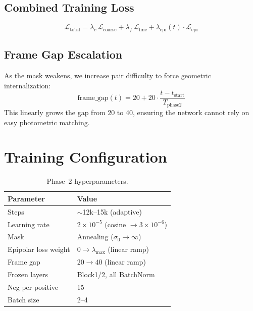 \documentclass[11pt,a4paper]{article}
\begin{document}
\subsection{Combined Training Loss}

\begin{equation}
    \mathcal{L}_{\text{total}} = \lambda_c\,\mathcal{L}_{\text{coarse}} + \lambda_f\,\mathcal{L}_{\text{fine}} + \lambda_{\text{epi}}(t)\cdot\mathcal{L}_{\text{epi}}
\end{equation}

\subsection{Frame Gap Escalation}

As the mask weakens, we increase pair difficulty to force geometric internalization:
\begin{equation}
    \text{frame\_gap}(t) = 20 + 20\cdot\frac{t - t_{\text{start}}}{T_{\text{phase2}}}
\end{equation}
This linearly grows the gap from 20 to 40, ensuring the network cannot rely on easy photometric matching.

\section{Training Configuration}

\begin{table}[h]
\centering
\caption{Phase~2 hyperparameters.}
\begin{tabular}{ll}
\toprule
\textbf{Parameter} & \textbf{Value} \\
\midrule
Steps & $\sim$12k--15k (adaptive) \\
Learning rate & $2\!\times\!10^{-5}$ (cosine $\to 3\!\times\!10^{-6}$) \\
Mask & Annealing ($\sigma_0 \to \infty$) \\
Epipolar loss weight & $0 \to \lambda_{\max}$ (linear ramp) \\
Frame gap & $20 \to 40$ (linear ramp) \\
Frozen layers & Block1/2, all BatchNorm \\
Neg per positive & 15 \\
Batch size & 2--4 \\
\bottomrule
\end{tabular}
\end{table}
\end{document}
